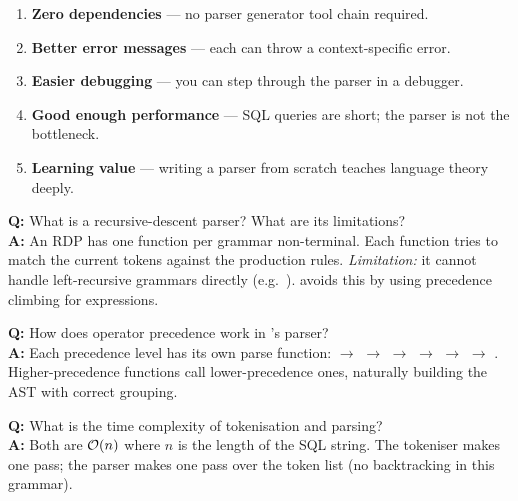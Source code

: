 \begin{deepdivebox}
\begin{enumerate}[nosep]
  \item \textbf{Zero dependencies} --- no parser generator tool chain required.
  \item \textbf{Better error messages} --- each  can throw a context-specific error.
  \item \textbf{Easier debugging} --- you can step through the parser in a debugger.
  \item \textbf{Good enough performance} --- SQL queries are short; the parser is not the bottleneck.
  \item \textbf{Learning value} --- writing a parser from scratch teaches language theory deeply.
\end{enumerate}
\end{deepdivebox}

\begin{interviewbox}
\textbf{Q:} What is a recursive-descent parser?  What are its limitations?\\[4pt]
\textbf{A:} An RDP has one function per grammar non-terminal.  Each function tries to match the current tokens against the production rules.  \emph{Limitation:} it cannot handle left-recursive grammars directly (e.g.\ ).  \shiftdb{} avoids this by using precedence climbing for expressions.

\vspace{6pt}
\textbf{Q:} How does operator precedence work in \shiftdb{}'s parser?\\[4pt]
\textbf{A:} Each precedence level has its own parse function:  $\to$  $\to$  $\to$  $\to$  $\to$  $\to$ .  Higher-precedence functions call lower-precedence ones, naturally building the AST with correct grouping.

\vspace{6pt}
\textbf{Q:} What is the time complexity of tokenisation and parsing?\\[4pt]
\textbf{A:} Both are $\mathcal{O}(n)$ where $n$ is the length of the SQL string.  The tokeniser makes one pass; the parser makes one pass over the token list (no backtracking in this grammar).
\end{interviewbox}
